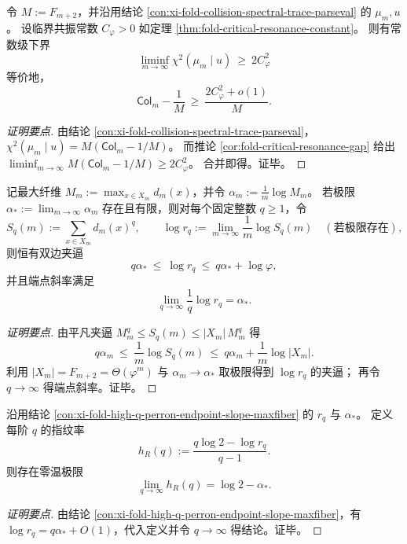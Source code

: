 \begin{conclusion}\label{con:xi-fold-chi2-constant-residual-energy}
令 \(M:=F_{m+2}\)，并沿用结论 \ref{con:xi-fold-collision-spectral-trace-parseval} 的 \(\mu_m,u\)。
设临界共振常数 \(C_\varphi>0\) 如定理 \ref{thm:fold-critical-resonance-constant}。
则有常数级下界
\[
\boxed{\;
\liminf_{m\to\infty}\chi^2(\mu_m\mid u)\ \ge\ 2C_\varphi^2\;}
\]
等价地，
\[
\mathsf{Col}_m-\frac1M\ \ge\ \frac{2C_\varphi^2+o(1)}{M}.
\]
\end{conclusion}
\begin{proof}[证明要点]
由结论 \ref{con:xi-fold-collision-spectral-trace-parseval}，
\(
\chi^2(\mu_m\mid u)=M(\mathsf{Col}_m-1/M)
\)。
而推论 \ref{cor:fold-critical-resonance-gap} 给出
\(
\liminf_{m\to\infty}M(\mathsf{Col}_m-1/M)\ge 2C_\varphi^2
\)。
合并即得。证毕。
\end{proof}

\begin{conclusion}\label{con:xi-fold-high-q-perron-endpoint-slope-maxfiber}
记最大纤维 \(M_m:=\max_{x\in X_m}d_m(x)\)，并令 \(\alpha_m:=\frac1m\log M_m\)。
若极限 \(\alpha_\ast:=\lim_{m\to\infty}\alpha_m\) 存在且有限，则对每个固定整数 \(q\ge 1\)，令
\[
S_q(m):=\sum_{x\in X_m}d_m(x)^q,
\qquad
\log r_q:=\lim_{m\to\infty}\frac{1}{m}\log S_q(m)
\quad(\text{若极限存在}),
\]
则恒有双边夹逼
\[
q\alpha_\ast\ \le\ \log r_q\ \le\ q\alpha_\ast+\log\varphi,
\]
并且端点斜率满足
\[
\lim_{q\to\infty}\frac{1}{q}\log r_q=\alpha_\ast.
\]
\end{conclusion}
\begin{proof}[证明要点]
由平凡夹逼 \(M_m^q\le S_q(m)\le |X_m|\,M_m^q\) 得
\[
q\alpha_m\ \le\ \frac{1}{m}\log S_q(m)\ \le\ q\alpha_m+\frac{1}{m}\log|X_m|.
\]
利用 \(|X_m|=F_{m+2}=\Theta(\varphi^m)\) 与 \(\alpha_m\to\alpha_\ast\) 取极限得到 \(\log r_q\) 的夹逼；
再令 \(q\to\infty\) 得端点斜率。证毕。
\end{proof}

\begin{conclusion}\label{con:xi-fold-renyi-fingerprint-rate-zero-temp}
沿用结论 \ref{con:xi-fold-high-q-perron-endpoint-slope-maxfiber} 的 \(r_q\) 与 \(\alpha_\ast\)。
定义每阶 \(q\) 的指纹率
\[
h_R(q):=\frac{q\log 2-\log r_q}{q-1}.
\]
则存在零温极限
\[
\boxed{\;\lim_{q\to\infty}h_R(q)=\log 2-\alpha_\ast.\;}
\]
\end{conclusion}
\begin{proof}[证明要点]
由结论 \ref{con:xi-fold-high-q-perron-endpoint-slope-maxfiber}，有 \(\log r_q=q\alpha_\ast+O(1)\)，代入定义并令 \(q\to\infty\) 得结论。证毕。
\end{proof}

